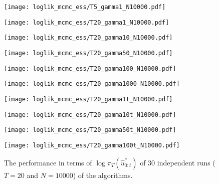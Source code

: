 \begin{figure}[!htbp]
    \centering
    \begin{minipage}{.5\textwidth}
        \centering
        \texttt{[image: loglik\_mcmc\_ess/T5\_gamma1\_N10000.pdf]}
    \end{minipage}%
    \begin{minipage}{0.5\textwidth}
        \centering
        \texttt{[image: loglik\_mcmc\_ess/T20\_gamma1\_N10000.pdf]}
    \end{minipage}
    \begin{minipage}{0.5\textwidth}
        \centering
        \texttt{[image: loglik\_mcmc\_ess/T20\_gamma10\_N10000.pdf]}
    \end{minipage}%
    \begin{minipage}{0.5\textwidth}
        \centering
        \texttt{[image: loglik\_mcmc\_ess/T20\_gamma50\_N10000.pdf]}
    \end{minipage}
    \begin{minipage}{0.5\textwidth}
        \centering
        \texttt{[image: loglik\_mcmc\_ess/T20\_gamma100\_N10000.pdf]}
    \end{minipage}%
    \begin{minipage}{0.5\textwidth}
        \centering
        \texttt{[image: loglik\_mcmc\_ess/T20\_gamma1000\_N10000.pdf]}
    \end{minipage}
    \begin{minipage}{0.5\textwidth}
        \centering
        \texttt{[image: loglik\_mcmc\_ess/T20\_gamma1t\_N10000.pdf]}
    \end{minipage}%
    \begin{minipage}{0.5\textwidth}
        \centering
        \texttt{[image: loglik\_mcmc\_ess/T20\_gamma10t\_N10000.pdf]}
    \end{minipage}
    \begin{minipage}{0.5\textwidth}
        \centering
        \texttt{[image: loglik\_mcmc\_ess/T20\_gamma50t\_N10000.pdf]}
    \end{minipage}%
    \begin{minipage}{0.5\textwidth}
        \centering
        \texttt{[image: loglik\_mcmc\_ess/T20\_gamma100t\_N10000.pdf]}
    \end{minipage}
    \caption{The performance in terms of $\log\pi_T(\hat{u}^*_{0:t})$ of 30 independent runs ($T=20$ and $N=10000$) of the algorithms.}
    \label{fig:ess}
\end{figure}

